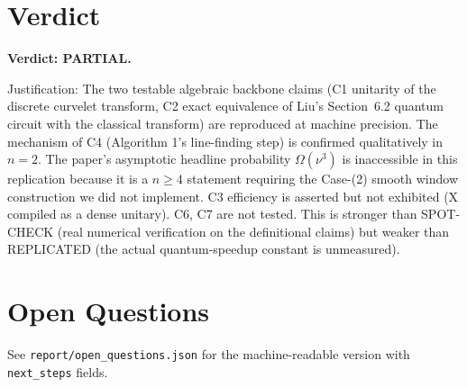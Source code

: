 \documentclass[11pt]{article}
\begin{document}
\section{Verdict}

\textbf{Verdict: PARTIAL.}

Justification: The two testable algebraic backbone claims (C1 unitarity of the discrete curvelet transform, C2 exact equivalence of Liu's Section~6.2 quantum circuit with the classical transform) are reproduced at machine precision. The mechanism of C4 (Algorithm 1's line-finding step) is confirmed qualitatively in $n=2$. The paper's asymptotic headline probability $\Omega(\nu^3)$ is inaccessible in this replication because it is a $n \geq 4$ statement requiring the Case-(2) smooth window construction we did not implement. C3 efficiency is asserted but not exhibited (X compiled as a dense unitary). C6, C7 are not tested. This is stronger than SPOT-CHECK (real numerical verification on the definitional claims) but weaker than REPLICATED (the actual quantum-speedup constant is unmeasured).

\section*{Open Questions}
See \texttt{report/open\_questions.json} for the machine-readable version with \texttt{next\_steps} fields.
\end{document}
